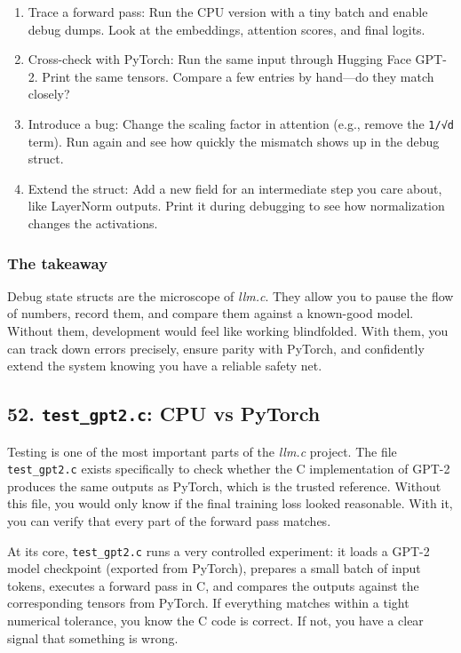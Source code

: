 \documentclass[
  letterpaper,
  DIV=11,
  numbers=noendperiod]{scrreprt}
\providecommand{\tightlist}{%
  \setlength{\itemsep}{0pt}\setlength{\parskip}{0pt}}
\begin{document}
\begin{enumerate}
\def\labelenumi{\arabic{enumi}.}
\tightlist
\item
  Trace a forward pass: Run the CPU version with a tiny batch and enable
  debug dumps. Look at the embeddings, attention scores, and final
  logits.
\item
  Cross-check with PyTorch: Run the same input through Hugging Face
  GPT-2. Print the same tensors. Compare a few entries by hand---do they
  match closely?
\item
  Introduce a bug: Change the scaling factor in attention (e.g., remove
  the \texttt{1/√d} term). Run again and see how quickly the mismatch
  shows up in the debug struct.
\item
  Extend the struct: Add a new field for an intermediate step you care
  about, like LayerNorm outputs. Print it during debugging to see how
  normalization changes the activations.
\end{enumerate}

\subsubsection{The takeaway}\label{the-takeaway-40}

Debug state structs are the microscope of \emph{llm.c}. They allow you
to pause the flow of numbers, record them, and compare them against a
known-good model. Without them, development would feel like working
blindfolded. With them, you can track down errors precisely, ensure
parity with PyTorch, and confidently extend the system knowing you have
a reliable safety net.

\subsection{\texorpdfstring{52. \texttt{test\_gpt2.c}: CPU vs
PyTorch}{52. test\_gpt2.c: CPU vs PyTorch}}\label{test_gpt2.c-cpu-vs-pytorch}

Testing is one of the most important parts of the \emph{llm.c} project.
The file \texttt{test\_gpt2.c} exists specifically to check whether the
C implementation of GPT-2 produces the same outputs as PyTorch, which is
the trusted reference. Without this file, you would only know if the
final training loss looked reasonable. With it, you can verify that
every part of the forward pass matches.

At its core, \texttt{test\_gpt2.c} runs a very controlled experiment: it
loads a GPT-2 model checkpoint (exported from PyTorch), prepares a small
batch of input tokens, executes a forward pass in C, and compares the
outputs against the corresponding tensors from PyTorch. If everything
matches within a tight numerical tolerance, you know the C code is
correct. If not, you have a clear signal that something is wrong.
\end{document}
